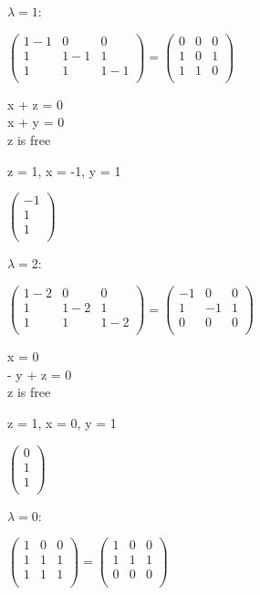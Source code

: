 \documentclass[12pt]{article}
\begin{document}
\begin{enumerate}
    $\lambda = 1$:

    $\begin{pmatrix}
        1 - 1 & 0 & 0 \\
        1 & 1 - 1 & 1 \\
        1 & 1 & 1 - 1\\
    \end{pmatrix} = \begin{pmatrix}
        0 & 0 & 0 \\
        1 & 0 & 1 \\
        1 & 1 & 0\\
    \end{pmatrix}$

    x + z = 0 \\
    x + y = 0 \\
    z is free

    z = 1, x = -1, y = 1

    $\begin{pmatrix}
        -1 \\
        1 \\
        1\\
    \end{pmatrix}$

    $\lambda = 2$:

    $\begin{pmatrix}
        1 - 2 & 0 & 0 \\
        1 & 1 - 2 & 1 \\
        1 & 1 & 1 - 2\\
    \end{pmatrix} = \begin{pmatrix}
        -1 & 0 & 0 \\
        1 & -1 & 1 \\
        0 & 0 & 0\\
    \end{pmatrix}$

    x = 0 \\
    - y + z = 0 \\
    z is free

    z = 1, x = 0, y = 1

    $\begin{pmatrix}
        0\\
        1 \\
        1\\
    \end{pmatrix}$

    $\lambda = 0$:

    $\begin{pmatrix}
        1 & 0 & 0 \\
        1 & 1 & 1 \\
        1 & 1 & 1 \\
    \end{pmatrix} = \begin{pmatrix}
        1 & 0 & 0 \\
        1 & 1 & 1 \\
        0 & 0 & 0\\
    \end{pmatrix}$


\end{enumerate}
\end{document}

